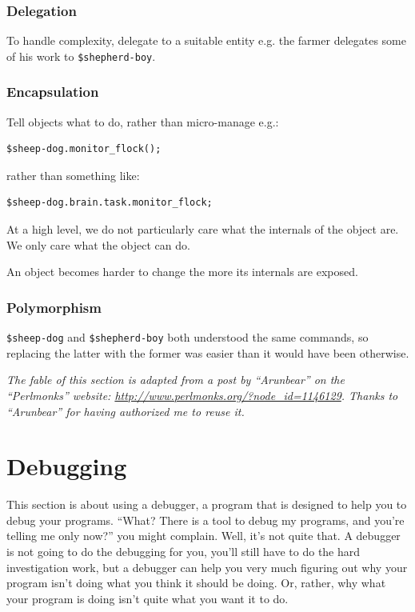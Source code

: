 \subsubsection{Delegation}

To handle complexity, delegate to a suitable 
entity e.g. the farmer delegates some of his 
work to \verb'$shepherd-boy'.

\subsubsection{Encapsulation}

Tell objects what to do, rather than micro-manage e.g.:

\begin{verbatim}
$sheep-dog.monitor_flock();
\end{verbatim}

rather than something like:

\begin{verbatim}
$sheep-dog.brain.task.monitor_flock;
\end{verbatim}

At a high level, we do not particularly care 
what the internals of the object are. We only 
care what the object can do.

An object becomes harder to change the 
more its internals are exposed.

\subsubsection{Polymorphism}
\verb'$sheep-dog' and \verb'$shepherd-boy' both 
understood the same commands, so replacing the 
latter with the former was easier than it would 
have been otherwise. 

\emph{The fable of this section is adapted 
from a post by ``Arunbear'' on the ``Perlmonks'' 
website: \url{http://www.perlmonks.org/?node_id=1146129}. 
Thanks to ``Arunbear'' for having authorized me 
to reuse it.}


\section{Debugging}
\label{perl-debugger}

This section is about using a debugger, a program that is 
designed to help you to debug your programs. ``What? There 
is a tool to debug my programs, and you're telling me only 
now?'' you might complain. Well, it's not quite that. A debugger 
is not going to do the debugging for you, you'll still have 
to do the hard investigation work, but a debugger can help 
you very much figuring out why your program isn't doing 
what you think it should be doing. Or, rather, why what your 
program is doing isn't quite what you want it to do.

